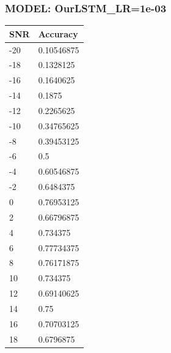 \documentclass[12pt,a4paper]{article}
\begin{document}
    \subsubsection{MODEL: OurLSTM_LR=1e-03}
    \begin{table}[!ht]
    \raggedright
    \begin{tabular}{|l|l|}
    \hline
        SNR & Accuracy \\ \hline
        -20 & 0.10546875 \\ \hline
        -18 & 0.1328125 \\ \hline
        -16 & 0.1640625 \\ \hline
        -14 & 0.1875 \\ \hline
        -12 & 0.2265625 \\ \hline
        -10 & 0.34765625 \\ \hline
        -8 & 0.39453125 \\ \hline
        -6 & 0.5 \\ \hline
        -4 & 0.60546875 \\ \hline
        -2 & 0.6484375 \\ \hline
        0 & 0.76953125 \\ \hline
        2 & 0.66796875 \\ \hline
        4 & 0.734375 \\ \hline
        6 & 0.77734375 \\ \hline
        8 & 0.76171875 \\ \hline
        10 & 0.734375 \\ \hline
        12 & 0.69140625 \\ \hline
        14 & 0.75 \\ \hline
        16 & 0.70703125 \\ \hline
        18 & 0.6796875 \\ \hline
    \end{tabular}
\end{table}
    \newpage
\end{document}
